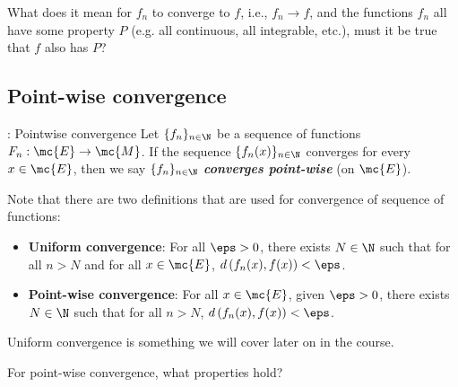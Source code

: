 \medskip

What does it mean for \(f_n\) to converge to \(f\), i.e., \(f_n\to f\), and the functions \(f_n\) all have some property \(P\) (e.g. all continuous, all integrable, etc.), must it be true that \(f\) also has \(P\)?

\subsection{Point-wise convergence}
\begin{ndef}{: Pointwise convergence}
	Let \(\{f_n\}_{n\in\N}\) be a sequence of functions \(F_n:\mc{E}\to\mc{M}\). If the sequence \(\{f_n(x)\}_{n\in\N}\) converges for every \(x\in\mc{E}\), then we say \(\{f_n\}_{n\in\N}\) \emph{\textbf{converges point-wise}} (on \(\mc{E}\)).
\end{ndef}
Note that there are two definitions that are used for convergence of sequence of functions:
\begin{itemize}
	\item\textbf{Uniform convergence}: For all \(\eps>0\), there exists \(N\in\N\) such that for all \(n>N\) and for all \(x\in\mc{E}\), \(\displaystyle d\left(f_n(x),f(x)\right)<\eps\).
	
	\item \textbf{Point-wise convergence}: For all \(x\in\mc{E}\), given \(\eps>0\), there exists \(N\in\N\) such that for all \(n>N\), \(\displaystyle d\left(f_n(x),f(x)\right)<\eps\).
\end{itemize}
Uniform convergence is something we will cover later on in the course.

\medskip

For point-wise convergence, what properties hold?

